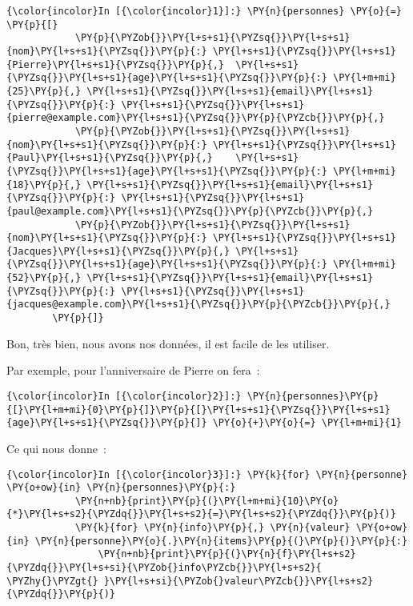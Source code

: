     \begin{Verbatim}[commandchars=\\\{\},frame=single,framerule=0.3mm,rulecolor=\color{cellframecolor}]
{\color{incolor}In [{\color{incolor}1}]:} \PY{n}{personnes} \PY{o}{=} \PY{p}{[}
            \PY{p}{\PYZob{}}\PY{l+s+s1}{\PYZsq{}}\PY{l+s+s1}{nom}\PY{l+s+s1}{\PYZsq{}}\PY{p}{:} \PY{l+s+s1}{\PYZsq{}}\PY{l+s+s1}{Pierre}\PY{l+s+s1}{\PYZsq{}}\PY{p}{,}  \PY{l+s+s1}{\PYZsq{}}\PY{l+s+s1}{age}\PY{l+s+s1}{\PYZsq{}}\PY{p}{:} \PY{l+m+mi}{25}\PY{p}{,} \PY{l+s+s1}{\PYZsq{}}\PY{l+s+s1}{email}\PY{l+s+s1}{\PYZsq{}}\PY{p}{:} \PY{l+s+s1}{\PYZsq{}}\PY{l+s+s1}{pierre@example.com}\PY{l+s+s1}{\PYZsq{}}\PY{p}{\PYZcb{}}\PY{p}{,}
            \PY{p}{\PYZob{}}\PY{l+s+s1}{\PYZsq{}}\PY{l+s+s1}{nom}\PY{l+s+s1}{\PYZsq{}}\PY{p}{:} \PY{l+s+s1}{\PYZsq{}}\PY{l+s+s1}{Paul}\PY{l+s+s1}{\PYZsq{}}\PY{p}{,}    \PY{l+s+s1}{\PYZsq{}}\PY{l+s+s1}{age}\PY{l+s+s1}{\PYZsq{}}\PY{p}{:} \PY{l+m+mi}{18}\PY{p}{,} \PY{l+s+s1}{\PYZsq{}}\PY{l+s+s1}{email}\PY{l+s+s1}{\PYZsq{}}\PY{p}{:} \PY{l+s+s1}{\PYZsq{}}\PY{l+s+s1}{paul@example.com}\PY{l+s+s1}{\PYZsq{}}\PY{p}{\PYZcb{}}\PY{p}{,}
            \PY{p}{\PYZob{}}\PY{l+s+s1}{\PYZsq{}}\PY{l+s+s1}{nom}\PY{l+s+s1}{\PYZsq{}}\PY{p}{:} \PY{l+s+s1}{\PYZsq{}}\PY{l+s+s1}{Jacques}\PY{l+s+s1}{\PYZsq{}}\PY{p}{,} \PY{l+s+s1}{\PYZsq{}}\PY{l+s+s1}{age}\PY{l+s+s1}{\PYZsq{}}\PY{p}{:} \PY{l+m+mi}{52}\PY{p}{,} \PY{l+s+s1}{\PYZsq{}}\PY{l+s+s1}{email}\PY{l+s+s1}{\PYZsq{}}\PY{p}{:} \PY{l+s+s1}{\PYZsq{}}\PY{l+s+s1}{jacques@example.com}\PY{l+s+s1}{\PYZsq{}}\PY{p}{\PYZcb{}}\PY{p}{,}
        \PY{p}{]}
\end{Verbatim}


    Bon, très bien, nous avons nos données, il est facile de les utiliser.

Par exemple, pour l'anniversaire de Pierre on fera~:

    \begin{Verbatim}[commandchars=\\\{\},frame=single,framerule=0.3mm,rulecolor=\color{cellframecolor}]
{\color{incolor}In [{\color{incolor}2}]:} \PY{n}{personnes}\PY{p}{[}\PY{l+m+mi}{0}\PY{p}{]}\PY{p}{[}\PY{l+s+s1}{\PYZsq{}}\PY{l+s+s1}{age}\PY{l+s+s1}{\PYZsq{}}\PY{p}{]} \PY{o}{+}\PY{o}{=} \PY{l+m+mi}{1}
\end{Verbatim}


    Ce qui nous donne~:

    \begin{Verbatim}[commandchars=\\\{\},frame=single,framerule=0.3mm,rulecolor=\color{cellframecolor}]
{\color{incolor}In [{\color{incolor}3}]:} \PY{k}{for} \PY{n}{personne} \PY{o+ow}{in} \PY{n}{personnes}\PY{p}{:}
            \PY{n+nb}{print}\PY{p}{(}\PY{l+m+mi}{10}\PY{o}{*}\PY{l+s+s2}{\PYZdq{}}\PY{l+s+s2}{=}\PY{l+s+s2}{\PYZdq{}}\PY{p}{)}
            \PY{k}{for} \PY{n}{info}\PY{p}{,} \PY{n}{valeur} \PY{o+ow}{in} \PY{n}{personne}\PY{o}{.}\PY{n}{items}\PY{p}{(}\PY{p}{)}\PY{p}{:}
                \PY{n+nb}{print}\PY{p}{(}\PY{n}{f}\PY{l+s+s2}{\PYZdq{}}\PY{l+s+si}{\PYZob{}info\PYZcb{}}\PY{l+s+s2}{ \PYZhy{}\PYZgt{} }\PY{l+s+si}{\PYZob{}valeur\PYZcb{}}\PY{l+s+s2}{\PYZdq{}}\PY{p}{)}
\end{Verbatim}


